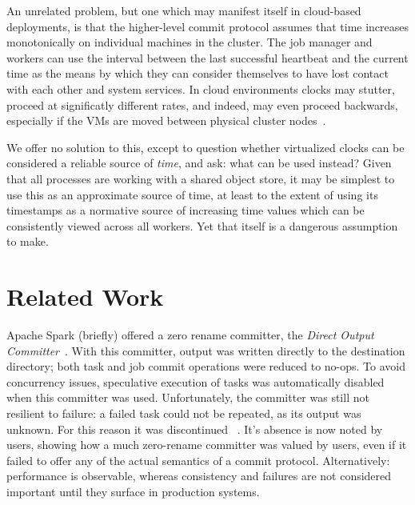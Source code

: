 \documentclass[9pt,technote]{IEEEtran}
\begin{document}
An unrelated problem, but one which may manifest itself in cloud-based deployments,
is that the higher-level commit protocol assumes that time increases monotonically
on individual machines in the cluster.
The job manager and workers can use the interval between the last successful heartbeat
and the current time as the means by which they can consider themselves to have lost
contact with each other and system services.
In cloud environments clocks may stutter, proceed at significatly different rates,
and indeed, may even proceed backwards, especially if the VMs are moved between
physical cluster nodes\ \cite{anything?}.

We offer no solution to this, except to question whether virtualized clocks can
be considered a reliable source of \emph{time}, and ask: what can be used instead?
Given that all processes are working with a shared object store, it may be simplest
to use this as an approximate source of time, at least to the extent of using
its timestamps as a normative source of increasing time values which can be
consistently viewed across all workers.
Yet that itself is a dangerous assumption to make.



\section{Related Work}
\label{sec:relatedWork}

Apache Spark (briefly) offered a zero rename committer,
the \emph{Direct Output Committer}\ \cite{JIRA}.
With this committer, output was written directly to the destination directory;
both task and job commit operations were reduced to no-ops.
To avoid concurrency issues, speculative execution of tasks was automatically
disabled when this committer was used.
Unfortunately, the committer was still not resilient to failure: a failed
task could not be repeated, as its output was unknown.
For this reason it was discontinued \ \cite{DOC-JIRA}.
It's absence is now noted by users, showing how a much zero-rename committer
was valued by users, even if it failed to offer any of the actual semantics
of a commit protocol.
Alternatively: performance is observable, whereas consistency and failures
are not considered important until they surface in production systems.
\end{document}
